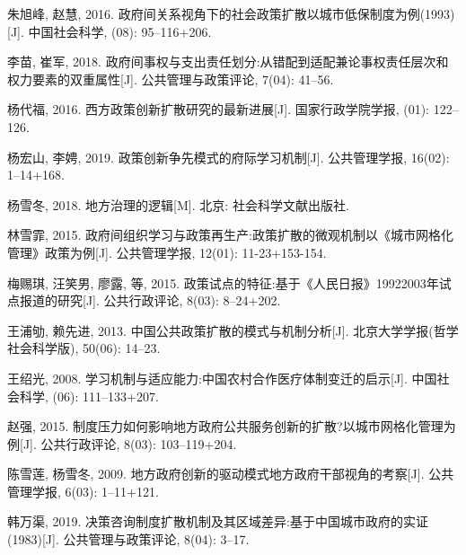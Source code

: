 \documentclass[
  12pt,
]{ctexart}
\newlength{\cslhangindent}
\newlength{\cslentryspacingunit} %
\newenvironment{CSLReferences}[2] %
 {%
  \setlength{\parindent}{0pt}
  \ifodd #1
  \let\oldpar\par
  \def\par{\hangindent=\cslhangindent\oldpar}
  \fi
  \setlength{\parskip}{#2\cslentryspacingunit}
 }%
 {}
\begin{document}
\begin{CSLReferences}{1}{0}
\leavevmode{}%
朱旭峰, 赵慧, 2016. {政府间关系视角下的社会政策扩散\textemdash\textemdash 以城市低保制度为例(1993)}{[}J{]}. 中国社会科学, (08): 95--116+206.

\leavevmode{}%
李苗, 崔军, 2018. {政府间事权与支出责任划分:从错配到适配\textemdash\textemdash 兼论事权责任层次和权力要素的双重属性}{[}J{]}. 公共管理与政策评论, 7(04): 41--56.

\leavevmode{}%
杨代福, 2016. {西方政策创新扩散研究的最新进展}{[}J{]}. 国家行政学院学报, (01): 122--126.

\leavevmode{}%
杨宏山, 李娉, 2019. {政策创新争先模式的府际学习机制}{[}J{]}. 公共管理学报, 16(02): 1--14+168.

\leavevmode{}%
杨雪冬, 2018. {地方治理的逻辑}{[}M{]}. {北京}: {社会科学文献出版社}.

\leavevmode{}%
林雪霏, 2015. {政府间组织学习与政策再生产:政策扩散的微观机制\textemdash\textemdash 以{《城市网格化管理》}政策为例}{[}J{]}. 公共管理学报, 12(01): 11-23+153-154.

\leavevmode{}%
梅赐琪, 汪笑男, 廖露, 等, 2015. {政策试点的特征:基于《人民日报》1992\textemdash 2003年试点报道的研究}{[}J{]}. 公共行政评论, 8(03): 8--24+202.

\leavevmode{}%
王浦劬, 赖先进, 2013. {中国公共政策扩散的模式与机制分析}{[}J{]}. 北京大学学报(哲学社会科学版), 50(06): 14--23.

\leavevmode{}%
王绍光, 2008. {学习机制与适应能力:中国农村合作医疗体制变迁的启示}{[}J{]}. 中国社会科学, (06): 111--133+207.

\leavevmode{}%
赵强, 2015. {制度压力如何影响地方政府公共服务创新的扩散?\textemdash\textemdash 以城市网格化管理为例}{[}J{]}. 公共行政评论, 8(03): 103--119+204.

\leavevmode{}%
陈雪莲, 杨雪冬, 2009. {地方政府创新的驱动模式\textemdash\textemdash 地方政府干部视角的考察}{[}J{]}. 公共管理学报, 6(03): 1--11+121.

\leavevmode{}%
韩万渠, 2019. {决策咨询制度扩散机制及其区域差异:基于中国城市政府的实证(1983)}{[}J{]}. 公共管理与政策评论, 8(04): 3--17.


\end{CSLReferences}
\end{document}
